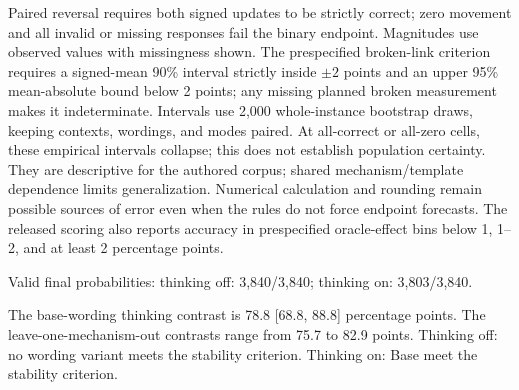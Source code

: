 Paired reversal requires both signed updates to be strictly correct; zero
movement and all invalid or missing responses fail the binary endpoint. Magnitudes
use observed values with missingness shown. The prespecified broken-link criterion
requires a signed-mean 90\% interval strictly inside $\pm2$ points and an upper
95\% mean-absolute bound below 2 points; any missing planned broken measurement
makes it indeterminate. Intervals use 2,000 whole-instance bootstrap draws,
keeping contexts, wordings, and modes paired. At all-correct or all-zero cells,
these empirical intervals collapse; this does not establish population certainty.
They are descriptive for the authored corpus; shared mechanism/template dependence limits generalization. Numerical
calculation and rounding remain possible sources of error even when the rules
do not force endpoint forecasts. The released scoring also reports accuracy in prespecified
oracle-effect bins below 1, 1--2, and at least 2 percentage points.

Valid final probabilities: thinking off: 3,840/3,840; thinking on: 3,803/3,840.

\begin{center}
\begin{minipage}{\linewidth}
\centering
{}
\label{tab:exp1-fresh-performance}
\small

\end{minipage}
\end{center}

The base-wording thinking contrast is 78.8 [68.8, 88.8] percentage points. The leave-one-mechanism-out contrasts range from 75.7 to 82.9 points. Thinking off: no wording variant meets the stability criterion. Thinking on: Base meet the stability criterion.

\begin{center}
\begin{minipage}{\linewidth}
\centering
{}
\label{tab:exp1-fresh-reasoning}
\small

\end{minipage}
\end{center}


